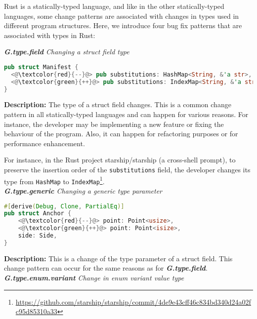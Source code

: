 Rust is a statically-typed language, and like in the other statically-typed languages, some change patterns are associated with changes in types used in different program structures. Here, we introduce four bug fix patterns that are associated with types in Rust:

\vspace{3mm}

\noindent\textit{\label{sec:G.type.field}\textbf{G.type.field} Changing a struct field type}

\begin{lstlisting}[language=Rust, style=colouredRust]
pub struct Manifest {
  <@\textcolor{red}{--}@> pub substitutions: HashMap<String, &'a str>,
  <@\textcolor{green}{++}@> pub substitutions: IndexMap<String, &'a str>,
}

\end{lstlisting}

\noindent\textbf{Description:} The type of a struct field changes. This is a common change pattern in all statically-typed languages and can happen for various reasons. For instance, the developer may be implementing a new feature or fixing the behaviour of the program. Also, it can happen for refactoring purposes or for performance enhancement. 

For instance, in the Rust project starship/starship (a cross-shell prompt), to preserve the insertion order of the \verb+substitutions+ field, the developer changes its type from \verb+HashMap+ to \verb+IndexMap+\footnote{\url{https://github.com/starship/starship/commit/4de9e43cff46c834bd340d24a02fc95d85310a33}}.
\\

\noindent\textit{\textbf{G.type.generic} Changing a generic type parameter}

\begin{lstlisting}[language=Rust, style=colouredRust]
#[derive(Debug, Clone, PartialEq)]
pub struct Anchor {
    <@\textcolor{red}{--}@> point: Point<usize>,
    <@\textcolor{green}{++}@> point: Point<isize>,
    side: Side,
}

\end{lstlisting}

\noindent\textbf{Description:} This is a change of the type parameter of a struct field. This change pattern can occur for the same reasons as for \textit{\textbf{G.type.field}}. \\

\noindent\textit{\textbf{G.type.enum.variant} Change in enum variant value type}

